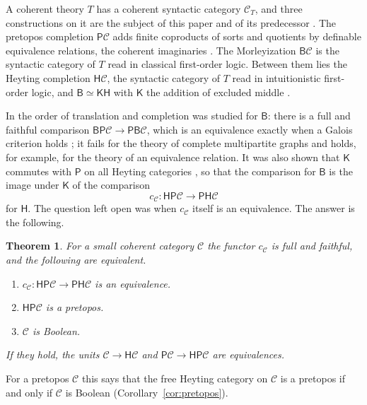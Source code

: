 \documentclass[11pt]{amsart}
\newtheorem{thm}{Theorem}[section]
\theoremstyle{definition}
\newcommand{\PP}{\mathsf P}
\newcommand{\BB}{\mathsf B}
\newcommand{\HH}{\mathsf H}
\newcommand{\KK}{\mathsf K}
\newcommand{\cC}{\mathcal C}
\begin{document}
A coherent theory $T$ has a coherent syntactic category $\cC_T$, and
three constructions on it are the subject of this paper and of its
predecessor \cite{Morley}. The pretopos completion $\PP\cC$ adds finite
coproducts of sorts and quotients by definable equivalence relations,
the coherent imaginaries \cite[A3.3, D1.4]{Elephant}. The Morleyization
$\BB\cC$ is the syntactic category of $T$ read in classical first-order
logic. Between them lies the Heyting completion $\HH\cC$, the syntactic
category of $T$ read in intuitionistic first-order logic, and
$\BB\simeq\KK\HH$ with $\KK$ the addition of excluded middle
\cite[\S9]{Morley}.

In \cite{Morley} the order of translation and completion was studied
for $\BB$: there is a full and faithful comparison
$\BB\PP\cC\to\PP\BB\cC$, which is an equivalence exactly when a Galois
criterion holds \cite[Thm.~6.1]{Morley}; it fails for the theory of
complete multipartite graphs and holds, for example, for the theory of
an equivalence relation. It was also shown that $\KK$ commutes with
$\PP$ on all Heyting categories \cite[Thm.~9.2]{Morley}, so that the
comparison for $\BB$ is the image under $\KK$ of the comparison
\[
c_\cC\colon\HH\PP\cC\longrightarrow\PP\HH\cC
\]
for $\HH$. The question left open was when $c_\cC$ itself is an
equivalence. The answer is the following.

\begin{thm}\label{thm:main}
For a small coherent category $\cC$ the functor $c_\cC$ is full and
faithful, and the following are equivalent.
\begin{enumerate}
\item[(i)] $c_\cC\colon\HH\PP\cC\to\PP\HH\cC$ is an equivalence.
\item[(ii)] $\HH\PP\cC$ is a pretopos.
\item[(iii)] $\cC$ is Boolean.
\end{enumerate}
If they hold, the units $\cC\to\HH\cC$ and $\PP\cC\to\HH\PP\cC$ are
equivalences.
\end{thm}

For a pretopos $\cC$ this says that the free Heyting category on $\cC$
is a pretopos if and only if $\cC$ is Boolean
(Corollary~\ref{cor:pretopos}).
\end{document}
